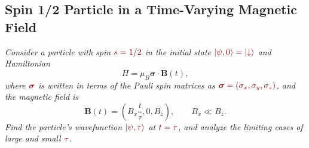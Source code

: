 \documentclass[11pt, a4paper]{article}
\newcommand{\dmath}[1]{\textcolor{Maroon}{#1}}  %
\newcommand{\Ham}{Hamiltonian\xspace}
\renewcommand{\vec}[1]{\bm{#1}} %
\newcommand{\p}{\psi}  %
\newcommand{\da}{\downarrow}  %
\begin{document}
\subsection{Spin 1/2 Particle in a Time-Varying Magnetic Field }
\textit{Consider a particle with spin $ \dmath{s = 1/2} $ in the initial state $ \dmath{\ket{\p, 0} = \ket{\da}} $ and \Ham}
\begin{equation*}
	H = \mu_{B}\vec{\sigma}\cdot \vec{B}(t),
\end{equation*}
\textit{where $ \dmath{\vec{\sigma}} $ is written in terms of the Pauli spin matrices as $ \dmath{\vec{\sigma} = (\sigma_{x}, \sigma_{y}, \sigma_{z})} $, and the magnetic field is}
\begin{equation*}
	\vec{B}(t) = \left(B_{x} \frac{t}{\tau}, 0, B_{z}\right), \qquad B_{x} \ll B_{z}.
\end{equation*}
\textit{Find the particle's wavefunction $ \dmath{\ket{\p, \tau}} $ at $ \dmath{t = \tau} $, and analyze the limiting cases of large and small $ \dmath{\tau} $.}
\end{document}
